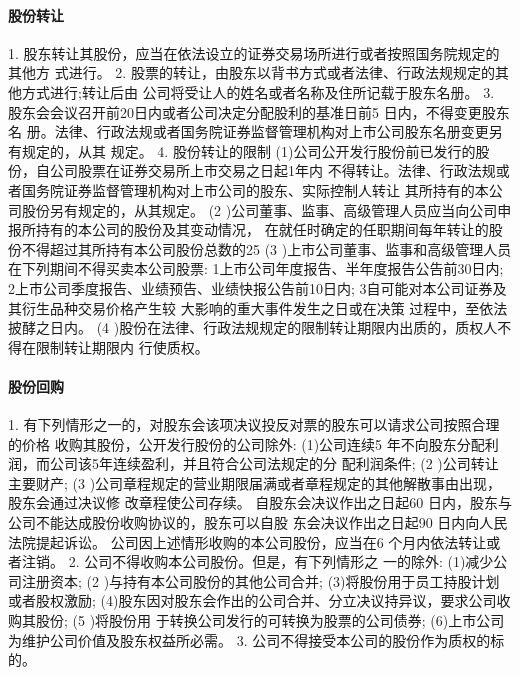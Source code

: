 \documentclass[UTF8,12pt]{ctexart}
\numberwithin{equation}{section} %
\numberwithin{figure}{section}
\numberwithin{table}{section}
\begin{document}
	\paragraph{股份转让}
	1. 股东转让其股份，应当在依法设立的证券交易场所进行或者按照国务院规定的其他方 式进行。
	2. 股票的转让，由股东以背书方式或者法律、行政法规规定的其他方式进行;转让后由 公司将受让人的姓名或者名称及住所记载于股东名册。
	3. 股东会会议召开前20日内或者公司决定分配股利的基准日前5 日内，不得变更股东名 册。法律、行政法规或者国务院证券监督管理机构对上市公司股东名册变更另有规定的，从其 规定。
	4. 股份转让的限制 (1)公司公开发行股份前已发行的股份，自公司股票在证券交易所上市交易之日起1年内 不得转让。法律、行政法规或者国务院证券监督管理机构对上市公司的股东、实际控制人转让 其所持有的本公司股份另有规定的，从其规定。
	(2 )公司董事、监事、高级管理人员应当向公司申报所持有的本公司的股份及其变动情况， 在就任时确定的任职期间每年转让的股份不得超过其所持有本公司股份总数的25%
	(3 )上市公司董事、监事和高级管理人员在下列期间不得买卖本公司股票: 1上市公司年度报告、半年度报告公告前30日内; 2上市公司季度报告、业绩预告、业绩快报公告前10日内; 3自可能对本公司证券及其衍生品种交易价格产生较 大影响的重大事件发生之日或在决策
	过程中，至依法披酵之日内。
	(4 )股份在法律、行政法规规定的限制转让期限内出质的，质权人不得在限制转让期限内 行使质权。
	
	
	\paragraph{股份回购}
	1. 有下列情形之一的，对股东会该项决议投反对票的股东可以请求公司按照合理的价格 收购其股份，公开发行股份的公司除外:
	(1)公司连续5 年不向股东分配利润，而公司该5年连续盈利，并且符合公司法规定的分 配利润条件;
	(2 )公司转让主要财产;
	(3 )公司章程规定的营业期限届满或者章程规定的其他解散事由出现，股东会通过决议修 改章程使公司存续。
	自股东会决议作出之日起60 日内，股东与公司不能达成股份收购协议的，股东可以自股 东会决议作出之日起90 日内向人民法院提起诉讼。 公司因上述情形收购的本公司股份，应当在6 个月内依法转让或者注销。
	2. 公司不得收购本公司股份。但是，有下列情形之 一的除外:
	(1)减少公司注册资本;
	(2 )与持有本公司股份的其他公司合并;
	(3)将股份用于员工持股计划或者股权激励; (4)股东因对股东会作出的公司合并、分立决议持异议，要求公司收购其股份;
	(5 )将股份用 于转换公司发行的可转换为股票的公司债券; (6)上市公司为维护公司价值及股东权益所必需。
	3. 公司不得接受本公司的股份作为质权的标的。
	
\end{document}
